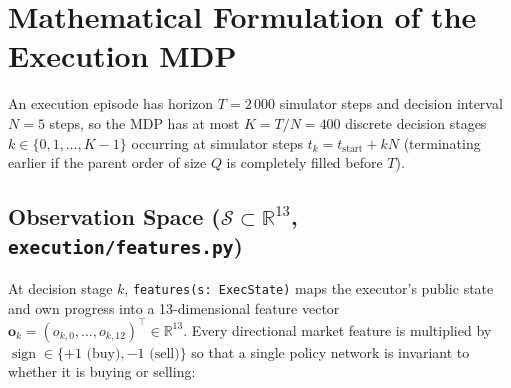 \documentclass[11pt,a4paper]{article}
\newcommand{\code}[1]{\texttt{#1}}
\newcommand{\sign}{\operatorname{sign}}
\begin{document}
\section{Mathematical Formulation of the Execution MDP}
\label{sec:mdp}

An execution episode has horizon $T = 2\,000$ simulator steps and decision interval $N = 5$ steps, so the
MDP has at most $K = T/N = 400$ discrete decision stages $k \in \{0, 1, \dots, K-1\}$ occurring at
simulator steps $t_k = t_{\text{start}} + kN$ (terminating earlier if the parent order of size $Q$ is
completely filled before $T$).

\subsection{Observation Space ($\mathcal{S} \subset \mathbb{R}^{13}$, \code{execution/features.py})}

At decision stage $k$, \code{features(s: ExecState)} maps the executor's public state and own progress
into a 13-dimensional feature vector $\mathbf{o}_k = (o_{k,0},\dots,o_{k,12})^\top \in \mathbb{R}^{13}$.
Every directional market feature is multiplied by $\sign \in \{+1\text{ (buy)}, -1\text{ (sell)}\}$ so
that a single policy network is invariant to whether it is buying or selling:
\end{document}
